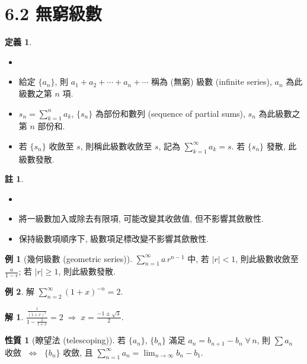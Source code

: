 \documentclass[12pt]{extarticle}
\newcommand{\ds}{\displaystyle}
\newcommand{\ie}{\;\Longrightarrow\;}
\newcommand{\ifff}{\;\Longleftrightarrow\;}
\theoremstyle{definition}
\newtheorem*{dfn}{定義}
\newtheorem*{prp}{性質}
\newtheorem*{ex}{例}
\newtheorem*{sol}{解}
\newtheorem*{rmk}{註}
\begin{document}
\section*{6.2 無窮級數}

\begin{dfn}
  \begin{itemize}\setlength{\itemsep}{0pt}
    \item[]
    \item 給定 $\{a_n\}$, 則 $\ds a_1 + a_2 + \cdots + a_n + \cdots$ 稱為 (無窮) 級數 (infinite series), $a_n$ 為此級數之第 $n$ 項. 
    \item $\ds s_n = \sum_{k = 1}^n a_k$, $\{s_n\}$ 為部份和數列 (sequence of partial sums), $s_n$ 為此級數之第 $n$ 部份和.  
    \item 若 $\{s_n\}$ 收斂至 $s$, 則稱此級數收斂至 $s$, 記為 $\ds\sum_{k = 1}^\infty a_k = s$. 若 $\{s_n\}$ 發散, 此級數發散. 
  \end{itemize}
\end{dfn}

\begin{rmk}
  \begin{itemize}\setlength{\itemsep}{0pt}
    \item[]
    \item 將一級數加入或除去有限項, 可能改變其收斂值, 但不影響其斂散性. 
    \item 保持級數項順序下, 級數項足標改變不影響其歛散性. 
  \end{itemize}
\end{rmk} 

\begin{ex}[幾何級數 (geometric series)]
  $\ds\sum_{n = 1}^\infty a\,r^{n - 1}$ 中, 若 $|r| < 1$, 則此級數收斂至 $\ds\frac{a}{1 - r}$; 若 $|r|\geqslant 1$, 則此級數發散.  
\end{ex}

\begin{ex}
  解 $\ds\sum_{n = 2}^\infty(1 + x)^{-n} = 2$. 
\end{ex}

\begin{sol}
  $\ds\frac{\frac{1}{(1 + x)^2}}{1 - \frac{1}{1 + x}} = 2 \ie x = \frac{-1\pm\sqrt{3}}{2}$. 
\end{sol}

\begin{prp}[瞭望法 (telescoping)]
  若 $\{a_n\}$, $\{b_n\}$ 滿足 $a_n = b_{n + 1} - b_n\;\forall\,n$, 則 $\ds\sum a_n$ 收斂 $\ifff$ $\{b_n\}$ 收斂, 且 $\ds\sum_{n = 1}^\infty a_n = \lim_{n\to\infty}b_n - b_1$. 
\end{prp}
\end{document}
